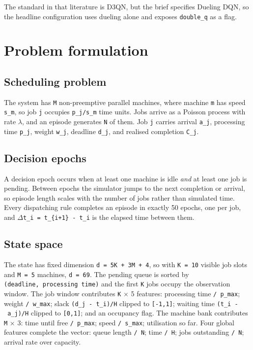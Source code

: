 The standard in that literature is D3QN, but the brief specifies Dueling DQN, so the headline configuration uses dueling alone and exposes
\texttt{double\_q} as a flag.

\section{Problem formulation}\label{problem-formulation}

\subsection{Scheduling problem}\label{the-scheduling-problem}

The system has \texttt{M} non-preemptive parallel machines, where machine \texttt{m} has speed \texttt{s\_m}, so job \texttt{j}
occupies \texttt{p\_j/s\_m} time units. Jobs arrive as a Poisson process with rate \texttt{$\lambda$}, and an episode
generates \texttt{N} of them. Job \texttt{j} carries arrival \texttt{a\_j}, processing time \texttt{p\_j}, weight \texttt{w\_j}, deadline
\texttt{d\_j}, and realised completion \texttt{C\_j}.

\subsection{Decision epochs}\label{decision-epochs}

A decision epoch occurs when at least one machine is idle \emph{and} at least one job is pending.
Between epochs the simulator jumps to the next completion or arrival, so episode length scales with
the number of jobs rather than simulated time. Every dispatching rule completes an episode in
exactly 50 epochs, one per job, and \texttt{$\Delta$t\_i\ =\ t\_\{i+1\}\ -\ t\_i} is the elapsed time between them.

\subsection{State space}\label{state-space}

The state has fixed dimension \texttt{d\ =\ 5K\ +\ 3M\ +\ 4}, so with \texttt{K\ =\ 10} visible job slots and \texttt{M\ =\ 5}
machines, \texttt{d\ =\ 69}. The pending queue is sorted by \texttt{(deadline,\ processing\ time)} and the first \texttt{K}
jobs occupy the observation window. The job window contributes \texttt{K} $\times$ 5 features: processing time
\texttt{/\ p\_max}; weight \texttt{/\ w\_max}; slack \texttt{(d\_j\ -\ t\_i)/H} clipped to \texttt{{[}-1,1{]}}; waiting time \texttt{(t\_i\ -\ a\_j)/H}
clipped to \texttt{{[}0,1{]}}; and an occupancy flag. The machine bank contributes \texttt{M} $\times$ 3: time until free
\texttt{/\ p\_max}; speed \texttt{/\ s\_max}; utilisation so far. Four global features complete the vector: queue
length \texttt{/\ N}; time \texttt{/\ H}; jobs outstanding \texttt{/\ N}; arrival rate over capacity.


